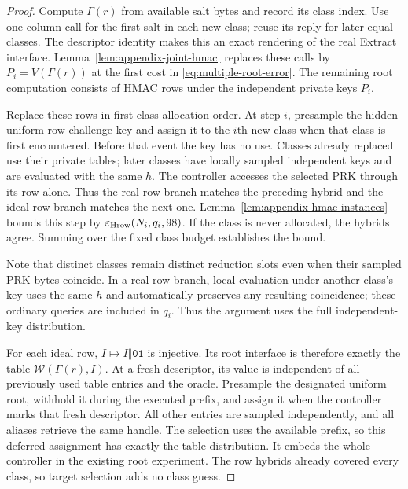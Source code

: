 \begin{proof}
Compute $\Gamma(r)$ from available salt bytes and record its class index.
Use one column call for the first salt in each new class; reuse its reply for
later equal classes. The descriptor identity makes this an exact rendering
of the real Extract interface. Lemma~\ref{lem:appendix-joint-hmac} replaces
these calls by $P_i=V(\Gamma(r))$ at the first cost in
\eqref{eq:multiple-root-error}. The remaining root computation consists of
HMAC rows under the independent private keys $P_i$.

Replace these rows in first-class-allocation order. At step $i$, presample
the hidden uniform row-challenge key and assign it to the $i$th new class
when that class is first encountered. Before that event the key has no use.
Classes already replaced use their private tables; later classes have locally
sampled independent keys and are evaluated with the same $h$. The controller
accesses the selected PRK through its row alone. Thus the real row branch
matches the preceding hybrid and the ideal row branch matches the next one.
Lemma~\ref{lem:appendix-hmac-instances} bounds this step by
$\varepsilon_{\rm Hrow}(N_i,q_i,98)$. If the class is never allocated, the
hybrids agree. Summing over the fixed class budget establishes the bound.

Note that distinct classes remain distinct reduction slots even when their sampled
PRK bytes coincide. In a real row branch, local evaluation under another
class's key uses the same $h$ and automatically preserves any resulting
coincidence; these ordinary queries are included in $q_i$. Thus the argument
uses the full independent-key distribution.

For each ideal row, $I\mapsto I\Vert\mathtt{01}$ is injective. Its root
interface is therefore exactly the table $\mathcal W(\Gamma(r),I)$.
At a fresh descriptor, its value is independent of all previously used table
entries and the oracle. Presample the designated uniform root, withhold it
during the executed prefix, and assign it when the controller marks that
fresh descriptor. All other entries are sampled independently, and
all aliases retrieve the same handle. The selection uses the available
prefix, so this deferred assignment has exactly the table distribution.
It embeds the whole controller in the existing root experiment. The row
hybrids already covered every class, so target selection adds no class guess.
\end{proof}


